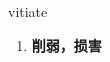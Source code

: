 
\begin{frame}
{\huge vitiate}
\begin{center}
\begin{enumerate}\Large
  \item \textbf{削弱，损害}
\end{enumerate}
\end{center}
\end{frame}
